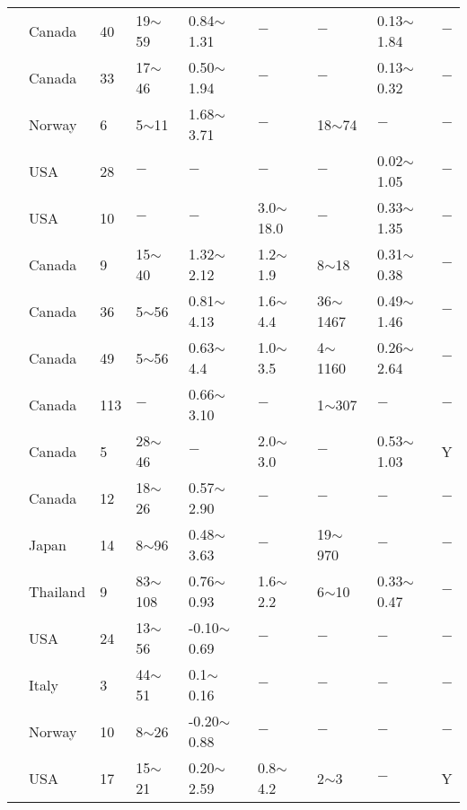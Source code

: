 {\begin{longtable}{lllllllll}
    \citet{DeLory19671} & Canada & 40    & 19$\sim$59 & 0.84$\sim$1.31 & $-$     & $-$     & 0.13$\sim$1.84 & $-$ \\
    \citet{DeLory196997} & Canada & 33    & 17$\sim$46 & 0.50$\sim$1.94 & $-$     & $-$     & 0.13$\sim$0.32 & $-$ \\
    \citet{DiBiagio19769} & Norway & 6     & 5$\sim$11  & 1.68$\sim$3.71 & $-$     & 18$\sim$74 & $-$     & $-$ \\
    \citet{Donaghe1978173} & USA   & 28    & $-$     & $-$     & $-$     & $-$     & 0.02$\sim$1.05 & $-$ \\
    \citet{Duncan196621} & USA   & 10    & $-$     & $-$     & 3.0$\sim$18.0 & $-$     & 0.33$\sim$1.35 & $-$ \\
    \citet{Eden196254} & Canada & 9     & 15$\sim$40 & 1.32$\sim$2.12 & 1.2$\sim$1.9 & 8$\sim$18  & 0.31$\sim$0.38 & $-$ \\
    \citet{Eden195722} & Canada & 36    & 5$\sim$56  & 0.81$\sim$4.13 & 1.6$\sim$4.4 & 36$\sim$1467 & 0.49$\sim$1.46 & $-$ \\
    \citet{Eden195741} & Canada & 49    & 5$\sim$56  & 0.63$\sim$4.4 & 1.0$\sim$3.5 & 4$\sim$1160 & 0.26$\sim$2.64 & $-$ \\
    \citet{Eden19611239} & Canada & 113   & $-$     & 0.66$\sim$3.10 & $-$     & 1$\sim$307 & $-$     & $-$ \\
    \citet{Eden1980369} & Canada & 5     & 28$\sim$46 & $-$     & 2.0$\sim$3.0 & $-$     & 0.53$\sim$1.03 & Y \\
    \citet{Eden196828} & Canada & 12    & 18$\sim$26 & 0.57$\sim$2.90 & $-$     & $-$     & $-$     & $-$ \\
    \citet{Egashira1982275} & Japan & 14    & 8$\sim$96  & 0.48$\sim$3.63 & $-$     & 19$\sim$970 & $-$     & $-$ \\
    \citet{Eide1972159} & Thailand & 9     & 83$\sim$108 & 0.76$\sim$0.93 & 1.6$\sim$2.2 & 6$\sim$10  & 0.33$\sim$0.47 & $-$ \\
    \citet{Endley1979101} & USA   & 24    & 13$\sim$56 & -0.10$\sim$0.69 & $-$     & $-$     & $-$     & $-$ \\
    \citet{Esu1969555} & Italy & 3     & 44$\sim$51 & 0.1$\sim$0.16 & $-$     & $-$     & $-$     & $-$ \\
    \citet{Feyling-Hanssen1957} & Norway & 10    & 8$\sim$26  & -0.20$\sim$0.88 & $-$     & $-$     & $-$     & $-$ \\
    \citet{Finno19891} & USA   & 17    & 15$\sim$21 & 0.20$\sim$2.59 & 0.8$\sim$4.2 & 2$\sim$3   & $-$     & Y \\

\end{longtable}}
